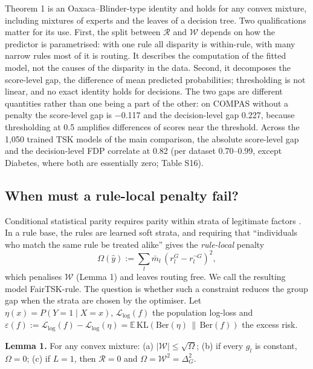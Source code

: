 Theorem 1 is an Oaxaca--Blinder-type identity \cite{oaxaca,blinder} and holds for any convex mixture, including mixtures of experts \cite{jacobs,shazeer} and the leaves of a decision tree. Two qualifications matter for its use. First, the split between \(\mathcal R\) and \(\mathcal W\) depends on how the predictor is parametrised: with one rule all disparity is within-rule, with many narrow rules most of it is routing. It describes the computation of the fitted model, not the causes of the disparity in the data. Second, it decomposes the score-level gap, the difference of mean predicted probabilities; thresholding is not linear, and no exact identity holds for decisions. The two gaps are different quantities rather than one being a part of the other: on COMPAS without a penalty the score-level gap is −0.117 and the decision-level gap 0.227, because thresholding at 0.5 amplifies differences of scores near the threshold. Across the 1,050 trained TSK models of the main comparison, the absolute score-level gap and the decision-level FDP correlate at 0.82 (per dataset 0.70--0.99, except Diabetes, where both are essentially zero; Table S16).

\hypertarget{when-must-a-rule-local-penalty-fail}{%
\subsection{When must a rule-local penalty fail?}\label{when-must-a-rule-local-penalty-fail}}

Conditional statistical parity requires parity within strata of legitimate factors \cite{kamiran2013,corbett}. In a rule base, the rules are learned soft strata, and requiring that ``individuals who match the same rule be treated alike'' gives the \emph{rule-local} penalty \[\Omega(\hat y) := \sum_{l}\bar{m}_{l}\,(r_{l}^{G} - r_{l}^{\neg G})^{2}, \tag{5}\] which penalises \(\mathcal W\) (Lemma 1) and leaves routing free. We call the resulting model FairTSK-rule. The question is whether such a constraint reduces the group gap when the strata are chosen by the optimiser. Let \(\eta(x) = P(Y = 1 \mid X = x)\), \(\mathcal{L}_{\log}(f)\) the population log-loss and \(\varepsilon(f) := \mathcal{L}_{\log}(f) - \mathcal{L}_{\log}(\eta) = \mathbb{E}\,\mathrm{KL}(\mathrm{Ber}(\eta)\,\|\,\mathrm{Ber}(f))\) the excess risk.

\textbf{Lemma 1.} For any convex mixture: (a) \(|\mathcal{W}| \leq \sqrt{\Omega}\); (b) if every \(g_l\) is constant, \(\Omega = 0\); (c) if \(L = 1\), then \(\mathcal{R} = 0\) and \(\Omega = \mathcal W^2 = \Delta_{G}^{2}\).

